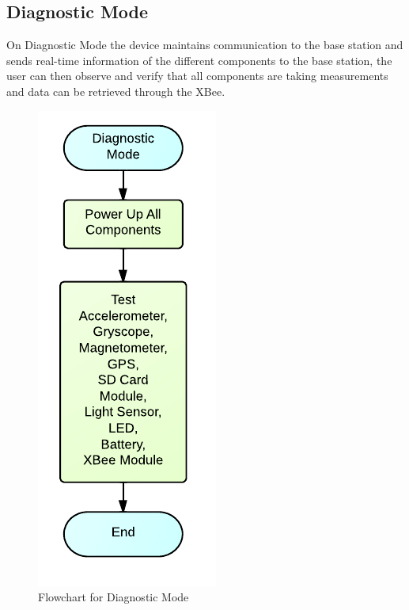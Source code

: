 \subsection{Diagnostic Mode}
On Diagnostic Mode the device maintains communication to the base station and sends real-time information of the different components to the base station, the user can then observe and verify that all components are taking measurements and data can be retrieved through the XBee.
\begin{figure}[H]
	\centering
	\includegraphics[scale=1.0]{img/DiagnosticMode}
	\caption{Flowchart for Diagnostic Mode \label{fig:diagnosticMode}}
\end{figure}

